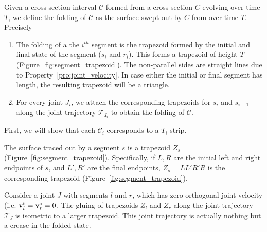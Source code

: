 \begin{definition}
\label{def:interval_folding}
Given a cross section interval $\mathcal C$ formed from a cross section $C$ evolving over time $T$,
we define the folding of $\mathcal C$ as the surface swept out by $C$ from over time $T$.
Precisely
\begin{enumerate}
\item The folding of a the $i^{th}$ segment is the trapezoid formed by the initial and final state of the segment ($s_i$ and $r_i$).
      This forms a trapezoid of height $T$ (Figure~\ref{fig:segment_trapezoid}).
      The non-parallel sides are straight lines due to Property~\ref{pro:joint_velocity}.
      In case either the initial or final segment has length, the resulting trapezoid will be a triangle.
\item For every joint $J_i$, we attach the corresponding trapezoids for $s_i$ and $s_{i+1}$
      along the joint trajectory $\mathcal T_{J_i}$ to obtain the folding of $\mathcal C$.
\end{enumerate}
\end{definition}

First, we will show that each $\mathcal C_i$ corresponds to a $T_i$-strip.

\begin{definition}
\label{def:trapezoid}
The surface traced out by a segment $s$ is a trapezoid $Z_s$ (Figure~\ref{fig:segment_trapezoid}).
Specifically, if $L,R$ are the initial left and right endpoints of $s$, and $L',R'$ are the final endpoints,
$Z_s = LL'R'R$ is the corresponding trapezoid (Figure~\ref{fig:segment_trapezoid}).
\end{definition}


\begin{lemma}
\label{lem:trapezoid_gluing_parallel}
Consider a joint $J$ with segments $l$ and $r$, which has zero orthogonal joint velocity (i.e. $\vec v_l^\shortparallel = \vec v_r^\shortparallel = 0$.
The gluing of trapezoids $Z_l$ and $Z_r$ along the joint trajectory $\mathcal T_J$ is isometric to a larger trapezoid.
This joint trajectory is actually nothing but a crease in the folded state.
\end{lemma}

